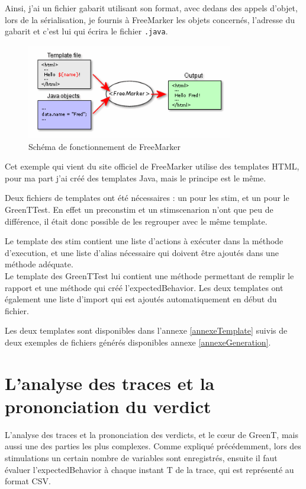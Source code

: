 		Ainsi, j'ai un fichier gabarit utilisant son format, avec dedans des appels d'objet, lors de la sérialisation, je fournis à FreeMarker les objets concernés, l'adresse du gabarit et c'est lui qui écrira le fichier \texttt{.java}.
		\begin{figure}[H]
		\centering
		\includegraphics[width=9cm]{contents/images/FreeMarkerSchema.png}
		\caption{Schéma de fonctionnement de FreeMarker}
		\end{figure}
		\begin{remarque}
		Cet exemple qui vient du site officiel de FreeMarker utilise des templates HTML, pour ma part j'ai créé des templates Java, mais le principe est le même.
		\end{remarque}

		Deux fichiers de templates ont été nécessaires : un pour les stim, et un pour le GreenTTest. En effet un preconstim et un stimscenarion n'ont que peu de différence, il était donc possible de les regrouper avec le même template.

		Le template des stim contient une liste d'actions à exécuter dans la méthode d'execution, et une liste d'alias nécessaire qui doivent être ajoutés dans une méthode adéquate. \\
		Le template des GreenTTest lui contient une méthode permettant de remplir le rapport et une méthode qui créé l'expectedBehavior.
		Les deux templates ont également une liste d'import qui est ajoutés automatiquement en début du fichier.

		Les deux templates sont disponibles dans l'annexe \ref{annexeTemplate} suivis de deux exemples de fichiers générés disponibles annexe \ref{annexeGeneration}.

	\section{L'analyse des traces et la prononciation du verdict}
	L'analyse des traces et la prononciation des verdicts, et le c\oe{}ur de GreenT, mais aussi une des parties les plus complexes. Comme expliqué précédemment, lors des stimulations un certain nombre de variables sont enregistrés, ensuite il faut évaluer l'expectedBehavior à chaque instant T de la trace, qui est représenté au format CSV. 

